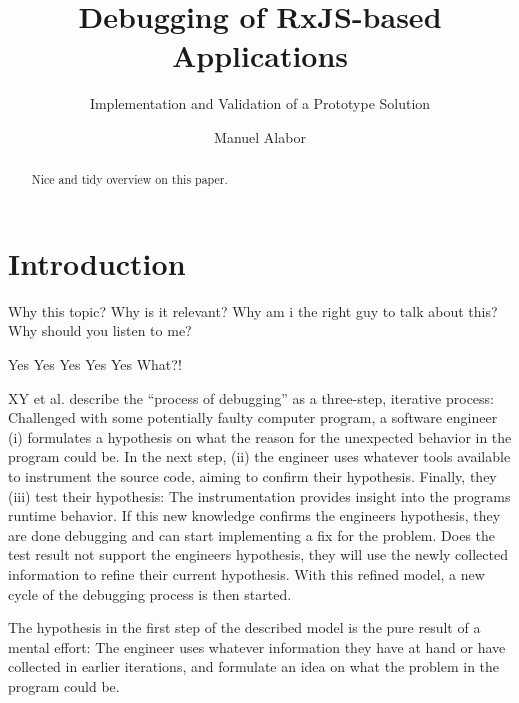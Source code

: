 \documentclass[sigplan,screen,nonacm,review]{acmart}
\title{Debugging of RxJS-based Applications}
\subtitle{Implementation and Validation of a Prototype Solution}
\author{Manuel Alabor}
\affiliation{
	\institution{Eastern Switzerland University of Applied Sciences}
	\city{Rapperswil}
	\country{Switzerland}
}
\begin{document}
\begin{abstract}
	Nice and tidy overview on this paper.
\end{abstract}




\maketitle

\section{Introduction}
\label{sec:intro}

Why this topic? Why is it relevant?
Why am i the right guy to talk about this?
Why should you listen to me?

Yes
Yes
Yes
Yes
Yes
What?!

XY et al. describe the ``process of debugging'' as a three-step, iterative process: Challenged with some potentially faulty computer program, a software engineer (i) formulates a hypothesis on what the reason for the unexpected behavior in the program could be. In the next step, (ii) the engineer uses whatever tools available to instrument the source code, aiming to confirm their hypothesis. Finally, they (iii) test their hypothesis: The instrumentation provides insight into the programs runtime behavior. If this new knowledge confirms the engineers hypothesis, they are done debugging and can start implementing a fix for the problem. Does the test result not support the engineers hypothesis, they will use the newly collected information to refine their current hypothesis. With this refined model, a new cycle of the debugging process is then started.

The hypothesis in the first step of the described model is the pure result of a mental effort: The engineer uses whatever information they have at hand or have collected in earlier iterations, and formulate an idea on what the problem in the program could be.  
\end{document}
